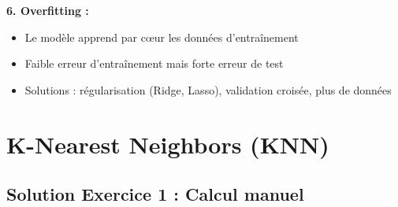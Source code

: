 \documentclass[11pt,a4paper]{article}
\begin{document}
\begin{solutionbox}
\textbf{6. Overfitting :}
\begin{itemize}
    \item Le modèle apprend par cœur les données d'entraînement
    \item Faible erreur d'entraînement mais forte erreur de test
    \item Solutions : régularisation (Ridge, Lasso), validation croisée, plus de données
\end{itemize}
\end{solutionbox}

\newpage


\section{K-Nearest Neighbors (KNN)}

\subsection{Solution Exercice 1 : Calcul manuel}
\end{document}
